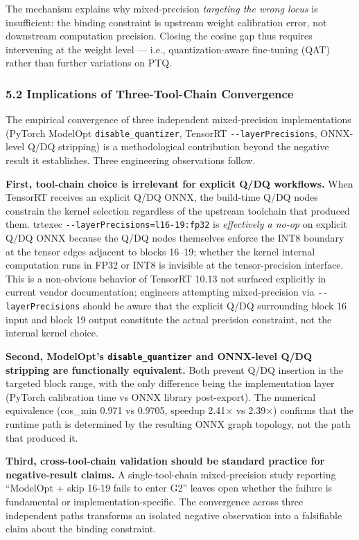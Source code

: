 \documentclass[
]{article}
\begin{document}
The mechanism explains why mixed-precision \emph{targeting the wrong
locus} is insufficient: the binding constraint is upstream weight
calibration error, not downstream computation precision. Closing the
cosine gap thus requires intervening at the weight level --- i.e.,
quantization-aware fine-tuning (QAT) rather than further variations on
PTQ.

\subsubsection{5.2 Implications of Three-Tool-Chain
Convergence}\label{implications-of-three-tool-chain-convergence}

The empirical convergence of three independent mixed-precision
implementations (PyTorch ModelOpt \texttt{disable\_quantizer}, TensorRT
\texttt{-\/-layerPrecisions}, ONNX-level Q/DQ stripping) is a
methodological contribution beyond the negative result it establishes.
Three engineering observations follow.

\textbf{First, tool-chain choice is irrelevant for explicit Q/DQ
workflows.} When TensorRT receives an explicit Q/DQ ONNX, the build-time
Q/DQ nodes constrain the kernel selection regardless of the upstream
toolchain that produced them. trtexec
\texttt{-\/-layerPrecisions=l16-19:fp32} is \emph{effectively a no-op}
on explicit Q/DQ ONNX because the Q/DQ nodes themselves enforce the INT8
boundary at the tensor edges adjacent to blocks 16--19; whether the
kernel internal computation runs in FP32 or INT8 is invisible at the
tensor-precision interface. This is a non-obvious behavior of TensorRT
10.13 not surfaced explicitly in current vendor documentation; engineers
attempting mixed-precision via \texttt{-\/-layerPrecisions} should be
aware that the explicit Q/DQ surrounding block 16 input and block 19
output constitute the actual precision constraint, not the internal
kernel choice.

\textbf{Second, ModelOpt's \texttt{disable\_quantizer} and ONNX-level
Q/DQ stripping are functionally equivalent.} Both prevent Q/DQ insertion
in the targeted block range, with the only difference being the
implementation layer (PyTorch calibration time vs ONNX library
post-export). The numerical equivalence (cos\_min 0.971 vs 0.9705,
speedup 2.41× vs 2.39×) confirms that the runtime path is determined by
the resulting ONNX graph topology, not the path that produced it.

\textbf{Third, cross-tool-chain validation should be standard practice
for negative-result claims.} A single-tool-chain mixed-precision study
reporting ``ModelOpt + skip 16-19 fails to enter G2'' leaves open
whether the failure is fundamental or implementation-specific. The
convergence across three independent paths transforms an isolated
negative observation into a falsifiable claim about the binding
constraint.
\end{document}
